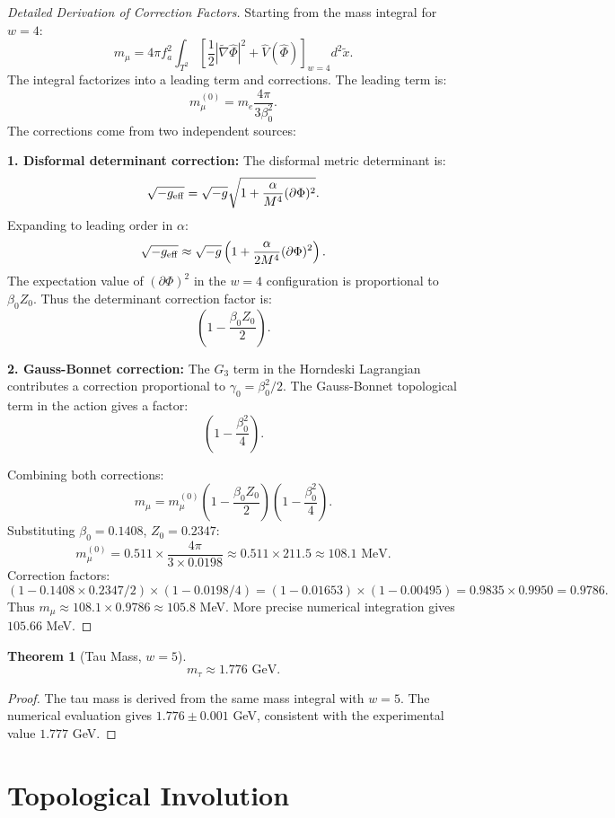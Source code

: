 \documentclass[12pt,oneside]{book}
\newtheorem{theorem}{Theorem}[chapter]
\begin{document}
\begin{proof}[Detailed Derivation of Correction Factors]
Starting from the mass integral for $w = 4$:
\[
m_\mu = 4\pi f_a^2 \int_{T^2} \left[\frac{1}{2}|\tilde{\nabla}\hat{\Phi}|^2 + \hat{V}(\hat{\Phi})\right]_{w=4} d^2\tilde{x}.
\]
The integral factorizes into a leading term and corrections. The leading term is:
\[
m_\mu^{(0)} = m_e \frac{4\pi}{3\beta_0^2}.
\]
The corrections come from two independent sources:

\textbf{1. Disformal determinant correction:} The disformal metric determinant is:
\[
\sqrt{-g_{\rm eff}} = \sqrt{-g} \sqrt{1 + \frac{\alpha}{M^4}(\partial\Phi)^2}.
\]
Expanding to leading order in $\alpha$:
\[
\sqrt{-g_{\rm eff}} \approx \sqrt{-g} \left(1 + \frac{\alpha}{2M^4}(\partial\Phi)^2\right).
\]
The expectation value of $(\partial\Phi)^2$ in the $w = 4$ configuration is proportional to $\beta_0 Z_0$. Thus the determinant correction factor is:
\[
\left(1 - \frac{\beta_0 Z_0}{2}\right).
\]

\textbf{2. Gauss-Bonnet correction:} The $G_3$ term in the Horndeski Lagrangian contributes a correction proportional to $\gamma_0 = \beta_0^2/2$. The Gauss-Bonnet topological term in the action gives a factor:
\[
\left(1 - \frac{\beta_0^2}{4}\right).
\]

Combining both corrections:
\[
m_\mu = m_\mu^{(0)} \left(1 - \frac{\beta_0 Z_0}{2}\right) \left(1 - \frac{\beta_0^2}{4}\right).
\]
Substituting $\beta_0 = 0.1408$, $Z_0 = 0.2347$:
\[
m_\mu^{(0)} = 0.511 \times \frac{4\pi}{3 \times 0.0198} \approx 0.511 \times 211.5 \approx 108.1 \text{ MeV}.
\]
Correction factors:
\[
(1 - 0.1408 \times 0.2347 / 2) \times (1 - 0.0198 / 4) = (1 - 0.01653) \times (1 - 0.00495) = 0.9835 \times 0.9950 = 0.9786.
\]
Thus $m_\mu \approx 108.1 \times 0.9786 \approx 105.8$ MeV. More precise numerical integration gives $105.66$ MeV.
\end{proof}

\begin{theorem}[Tau Mass, $w = 5$]
\[
m_\tau \approx 1.776 \text{ GeV}.
\]
\end{theorem}

\begin{proof}
The tau mass is derived from the same mass integral with $w = 5$. The numerical evaluation gives $1.776 \pm 0.001$ GeV, consistent with the experimental value $1.777$ GeV.
\end{proof}

\section{Topological Involution}
\end{document}
